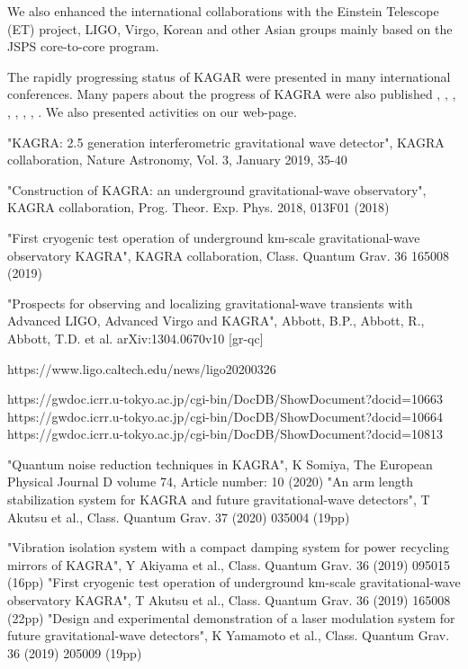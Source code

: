 We also enhanced the international collaborations with the Einstein Telescope (ET) project, LIGO, Virgo, Korean and other Asian groups mainly based on the JSPS core-to-core program.

The rapidly progressing status of KAGAR were presented in many international conferences. Many papers about the progress of KAGRA were also published  \cite{quantum},  \cite{als}, \cite{damping}, \cite{cryo-op}, \cite{mzm}, \cite{contami}, \cite{sapphire mirror}, \cite{kagra status}. We also presented activities on our web-page.\cite{KAGRA}

\begin{thebibliography}{99}


 "KAGRA: 2.5 generation interferometric gravitational wave detector",
KAGRA collaboration, Nature Astronomy, Vol. 3, January 2019, 35-40

 "Construction of KAGRA: an underground gravitational-wave observatory",
KAGRA collaboration,
Prog. Theor. Exp. Phys. 2018, 013F01 (2018)

 "First cryogenic test operation of underground km-scale gravitational-wave observatory KAGRA",
KAGRA collaboration, Class. Quantum Grav. 36 165008 (2019)


 "Prospects for observing and localizing gravitational-wave transients with Advanced LIGO, Advanced Virgo and KAGRA",
Abbott, B.P., Abbott, R., Abbott, T.D. et al. arXiv:1304.0670v10 [gr-qc]

 https://www.ligo.caltech.edu/news/ligo20200326

 https://gwdoc.icrr.u-tokyo.ac.jp/cgi-bin/DocDB/ShowDocument?docid=10663
 https://gwdoc.icrr.u-tokyo.ac.jp/cgi-bin/DocDB/ShowDocument?docid=10664
 https://gwdoc.icrr.u-tokyo.ac.jp/cgi-bin/DocDB/ShowDocument?docid=10813

 "Quantum noise reduction techniques in KAGRA", K Somiya, The European Physical Journal D volume 74, Article number: 10 (2020)
 "An arm length stabilization system for KAGRA and future gravitational-wave detectors", T Akutsu et al., Class. Quantum Grav. 37 (2020) 035004 (19pp)

 "Vibration isolation system with a compact damping system for power recycling mirrors of KAGRA", Y Akiyama et al., Class. Quantum Grav. 36 (2019) 095015 (16pp)
 "First cryogenic test operation of underground km-scale gravitational-wave observatory KAGRA", T Akutsu et al., Class. Quantum Grav. 36 (2019) 165008 (22pp)
 "Design and experimental demonstration of a laser modulation system for future gravitational-wave detectors", K Yamamoto et al., Class. Quantum Grav. 36 (2019) 205009 (19pp)


\end{thebibliography}
